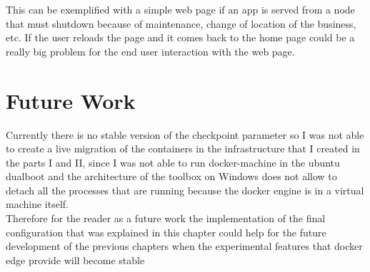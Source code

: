 This can be exemplified with a simple web page if an app is served from a node that must shutdown because of maintenance, change of location of the business, etc. If the user reloads the page and it comes back to the home page could be a really big problem for the end user interaction with the web page.

\chapter{Future Work}

Currently there is no stable version of the checkpoint parameter so I was not able to create a live migration of the containers in the infrastructure that I created in the parts I and II, since I was not able to run docker-machine in the ubuntu dualboot and the architecture of the toolbox on Windows does not allow to detach all the processes that are running because the docker engine is in a virtual machine itself. \\

Therefore for the reader as a future work the implementation of the final configuration that was explained in this chapter could help for the future development of the previous chapters when the experimental features that docker edge provide will become stable 